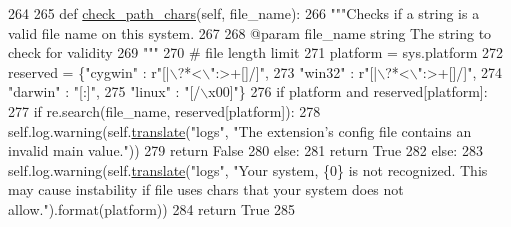 \begin{DoxyCode}
264 
265     \textcolor{keyword}{def }\hyperlink{classcommotion__client_1_1utils_1_1validate_1_1ClientConfig_a2ca1bc57887049e8c5c8ce6a8a2b9eb7}{check\_path\_chars}(self, file\_name):
266         \textcolor{stringliteral}{"""Checks if a string is a valid file name on this system.}
267 \textcolor{stringliteral}{}
268 \textcolor{stringliteral}{        @param file\_name string The string to check for validity}
269 \textcolor{stringliteral}{        """}
270         \textcolor{comment}{# file length limit}
271         platform = sys.platform
272         reserved = \{\textcolor{stringliteral}{"cygwin"} : \textcolor{stringliteral}{r"[|\(\backslash\)?*<\(\backslash\)":>+[]/]"},
273                     \textcolor{stringliteral}{"win32"} : \textcolor{stringliteral}{r"[|\(\backslash\)?*<\(\backslash\)":>+[]/]"},
274                     \textcolor{stringliteral}{"darwin"} : \textcolor{stringliteral}{"[:]"},
275                     \textcolor{stringliteral}{"linux"} : \textcolor{stringliteral}{"[/\(\backslash\)x00]"}\}
276         \textcolor{keywordflow}{if} platform \textcolor{keywordflow}{and} reserved[platform]:
277             \textcolor{keywordflow}{if} re.search(file\_name, reserved[platform]):
278                 self.log.warning(self.\hyperlink{classcommotion__client_1_1utils_1_1validate_1_1ClientConfig_a12d19377a853ce92cc0e0d758acdd804}{translate}(\textcolor{stringliteral}{"logs"}, \textcolor{stringliteral}{"The extension's config file contains an
       invalid main value."}))
279                 \textcolor{keywordflow}{return} \textcolor{keyword}{False}
280             \textcolor{keywordflow}{else}:
281                 \textcolor{keywordflow}{return} \textcolor{keyword}{True}
282         \textcolor{keywordflow}{else}:
283             self.log.warning(self.\hyperlink{classcommotion__client_1_1utils_1_1validate_1_1ClientConfig_a12d19377a853ce92cc0e0d758acdd804}{translate}(\textcolor{stringliteral}{"logs"}, \textcolor{stringliteral}{"Your system, \{0\} is not recognized. This may
       cause instability if file uses chars that your system does not allow."}).format(platform))
284             \textcolor{keywordflow}{return} \textcolor{keyword}{True}
285                 
            
\end{DoxyCode}
